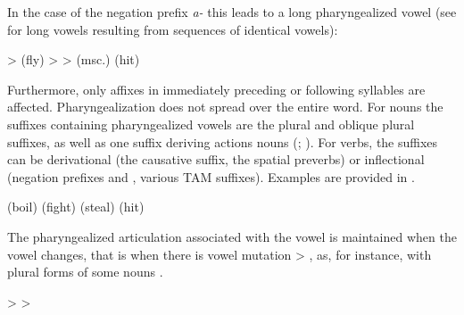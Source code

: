 In the case of the negation prefix \textit{a-} this leads to a long pharyngealized vowel (see  for long vowels resulting from sequences of identical vowels):

\begin{exe}
	\ex	\label{ex:pharyngealization long vowel}
\begin{xlist}
\ex	{} >   (fly)
\ex	{} >  >   (msc.) (hit)
	\end{xlist}
\end{exe}	


Furthermore, only affixes in immediately preceding or following syllables are affected. Pharyngealization does not spread over the entire word. For nouns the suffixes containing pharyngealized vowels are the plural and oblique plural suffixes, as well as one suffix deriving actions nouns (; ). For verbs, the suffixes can be derivational (the causative suffix, the spatial preverbs) or inflectional (negation prefixes  and , various TAM suffixes). Examples are provided in .
%
\begin{exe}
	\ex	\label{ex:pharyngealization spread phon}
\begin{xlist}
		\ex {} 	
		\ex {}  
		\ex {}  (boil)	
		\ex {}  (fight) 
		\ex {}  (steal)	
		\ex	{}  (hit)
\end{xlist}
\end{exe}

The pharyngealized articulation associated with the vowel is maintained when the vowel changes, that is when there is vowel mutation  > , as, for instance, with plural forms of some nouns .
%
\begin{exe}
	\ex	\label{ex:vowel mutation plural phon}
	\begin{xlist}
		\ex	{}  >  
		\ex	{}  >  
	\end{xlist}
\end{exe}

